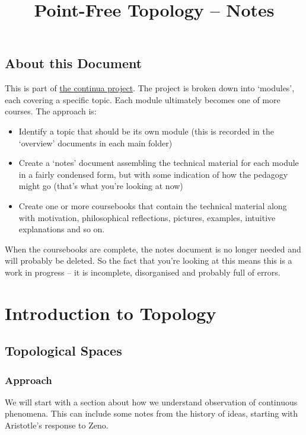 \documentclass[oneside,english]{amsbook}
\numberwithin{section}{chapter}
\theoremstyle{plain}
\theoremstyle{definition}
\begin{document}
\title{Point-Free Topology -- Notes}

\maketitle

\tableofcontents

\chapter*{About this Document}

This is part of \href{https://github.com/FineArtMaths/continua}{the continua project}. The project is broken down into `modules', each covering a specific topic. Each module ultimately becomes one of more courses. The approach is:

\begin{itemize}
	\item{Identify a topic that should be its own module (this is recorded in the `overview' documents in each main folder)}
	\item{Create a `notes' document assembling the technical material for each module in a fairly condensed form, but with some indication of how the pedagogy might go (that's what you're looking at now)}
	\item{Create one or more coursebooks that contain the technical material along with motivation, philosophical reflections, pictures, examples, intuitive explanations and so on.}
\end{itemize}

When the coursebooks are complete, the notes document is no longer needed and will probably be deleted. So the fact that you're looking at this means this is a work in progress -- it is incomplete, disorganised and probably full of errors.

\part{Introduction to Topology}

\chapter{Topological Spaces}

\section{Approach}

We will start with a section about how we understand observation of continuous phenomena. This can include some notes from the history of ideas, starting with Aristotle's response to Zeno.
\end{document}

